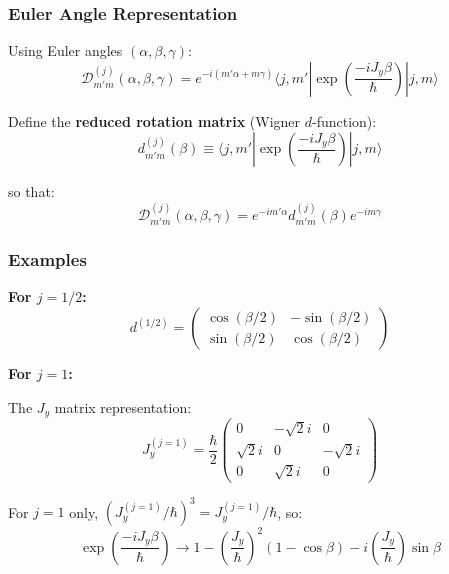 \documentclass[11pt,a4paper]{article}
\begin{document}
\subsubsection{Euler Angle Representation}

Using Euler angles $(\alpha, \beta, \gamma)$:
\begin{equation}
\mathscr{D}_{m'm}^{(j)}(\alpha, \beta, \gamma) = e^{-i(m'\alpha + m\gamma)}\langle j, m'|\exp\left(\frac{-iJ_y\beta}{\hbar}\right)|j, m\rangle
\tag{3.202}
\end{equation}

Define the \textbf{reduced rotation matrix} (Wigner $d$-function):
\begin{equation}
\boxed{d_{m'm}^{(j)}(\beta) \equiv \langle j, m'|\exp\left(\frac{-iJ_y\beta}{\hbar}\right)|j, m\rangle}
\tag{3.203}
\end{equation}

so that:
\begin{equation}
\mathscr{D}_{m'm}^{(j)}(\alpha, \beta, \gamma) = e^{-im'\alpha}d_{m'm}^{(j)}(\beta)e^{-im\gamma}
\end{equation}

\subsubsection{Examples}

\textbf{For $j = 1/2$:}
\begin{equation}
d^{(1/2)} = \begin{pmatrix} \cos(\beta/2) & -\sin(\beta/2) \\ \sin(\beta/2) & \cos(\beta/2) \end{pmatrix}
\tag{3.204}
\end{equation}

\textbf{For $j = 1$:}

The $J_y$ matrix representation:
\begin{equation}
J_y^{(j=1)} = \frac{\hbar}{2}\begin{pmatrix} 0 & -\sqrt{2}i & 0 \\ \sqrt{2}i & 0 & -\sqrt{2}i \\ 0 & \sqrt{2}i & 0 \end{pmatrix}
\tag{3.206}
\end{equation}

For $j = 1$ only, $(J_y^{(j=1)}/\hbar)^3 = J_y^{(j=1)}/\hbar$, so:
\begin{equation}
\exp\left(\frac{-iJ_y\beta}{\hbar}\right) \to 1 - \left(\frac{J_y}{\hbar}\right)^2(1 - \cos\beta) - i\left(\frac{J_y}{\hbar}\right)\sin\beta
\tag{3.208}
\end{equation}
\end{document}
